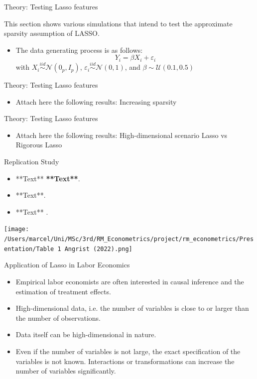 \documentclass{beamer}
\begin{document}
\begin{frame}{Theory: Testing Lasso features}
\begin{flushleft}
This section shows various simulations that intend to test the approximate sparsity assumption of LASSO.
\end{flushleft}
	\begin{itemize}
		\item The data generating process is as follows:
		\[Y_i = \beta X_i + \varepsilon_i\]
		with \(X_i \stackrel{iid}{\sim} \mathcal{N}(0_p,I_p)\), \(\varepsilon_i \stackrel{iid}{\sim} \mathcal{N}(0,1)\), and \(\beta  {\sim}  \mathcal{U}(0.1,0.5)\) 
	\end{itemize}
\end{frame}


\begin{frame}{Theory: Testing Lasso features}
	\begin{itemize}
		\item Attach here the following results: Increasing sparsity
	\end{itemize}
\end{frame}



\begin{frame}{Theory: Testing Lasso features}
	\begin{itemize}
		\item Attach here the following results: High-dimensional scenario Lasso vs Rigorous Lasso
	\end{itemize}
\end{frame}


\begin{frame}{Replication Study}
\begin{itemize}
  
\item **Text** \textbf{**Text**}.
\item **Text**. 
\item **Text** .
\end{itemize}

\texttt{[image: /Users/marcel/Uni/MSc/3rd/RM\_Econometrics/project/rm\_econometrics/Presentation/Table 1 Angrist (2022).png]}
\end{frame}

\begin{frame}{Application of Lasso in Labor Economics}
\begin{itemize}
	\item Empirical labor economists are often interested in causal inference and the estimation of treatment effects.
	\item High-dimensional data, i.e. the number of variables is close to or larger than the number of observations.
	\item Data itself can be high-dimensional in nature.
	\item Even if the number of variables is not large, the exact specification of the variables is not known. Interactions or transformations can increase the number of variables significantly.
\end{itemize}	
\end{frame}
\end{document}
